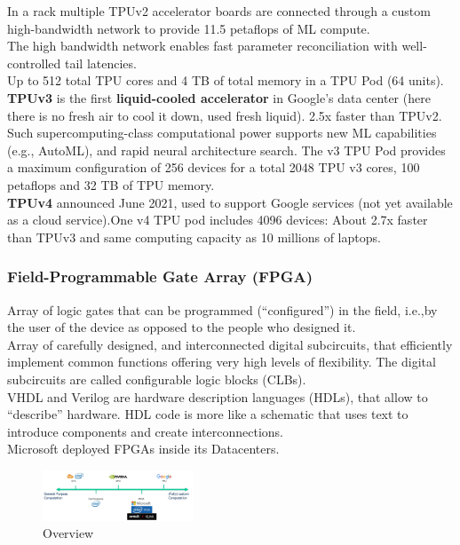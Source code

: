 \documentclass[10pt, oneside]{article}
\begin{document}
In a rack multiple TPUv2 accelerator boards are connected through a custom high-bandwidth network to provide 11.5 petaflops of ML compute.\\
The high bandwidth network enables fast parameter reconciliation with well-controlled tail latencies.\\ Up to 512 total TPU cores and 4 TB of total memory in a TPU Pod (64 units).\\
\textbf{TPUv3} is the first \textbf{liquid-cooled accelerator}
in Google’s data center (here there is no fresh air to cool it down, used fresh liquid). 2.5x faster than TPUv2. Such supercomputing-class computational power supports new ML capabilities (e.g., AutoML), and rapid neural architecture search. The v3 TPU Pod provides a maximum configuration of 256 devices for a total 2048 TPU v3 cores, 100 petaflops and 32 TB of TPU memory.\\
\textbf{TPUv4} announced June 2021, used to support Google services (not yet available as a cloud service).One v4 TPU pod includes 4096 devices: About 2.7x faster than TPUv3 and same computing capacity as 10
millions of laptops. 


\subsubsection{Field-Programmable Gate Array (FPGA)}
Array of logic gates that can be programmed (“configured”) in the field, i.e.,by the user of the device as opposed to the people who designed it.\\ Array of carefully designed, and interconnected digital subcircuits, that efficiently implement common functions offering very high levels of flexibility. The digital subcircuits are called configurable logic blocks (CLBs).\\VHDL and Verilog are hardware description languages (HDLs), that allow to “describe” hardware. HDL code is more like a schematic that uses text to introduce components and create interconnections.\\Microsoft deployed FPGAs inside its Datacenters.
\begin{figure}[H]
    \begin{center}
    \includegraphics[width=0.4\textwidth]{img/img11.png}
    \caption{Overview}
    \label{fig:Overview}
    \end{center}
\end{figure}
\end{document}
